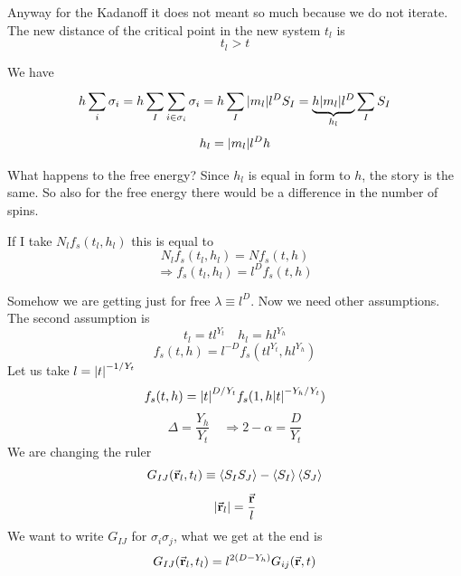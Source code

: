 \documentclass[../main/main.tex]{subfiles}
\begin{document}
Anyway for the Kadanoff it does not meant so much because we do not iterate.
The new distance of the critical point in the new system \( t_l \) is
\begin{equation}
  t_l > t
\end{equation}

We have
\begin{equation}
  h \sum_{i}^{} \sigma _i = h \sum_{I}^{} \sum_{i \in \sigma _i}^{}  \sigma _i = h \sum_{I}^{}    \abs{m_l} l^D S_I
  = \underbrace{h \abs{m_l} l^D}_{h_l} \sum_{I}^{} S_I
\end{equation}
\begin{equation}
  h_l = \abs{m_l} l^D h
\end{equation}

What happens to the free energy?
Since \( h_l \) is equal in form to \( h \), the story is the same. So also for the free energy there would be a difference in the number of spins.

If I take \(   N_l f_s (t_l,h_l) \) this is equal to
\begin{equation}
  N_l f_s (t_l,h_l) = N f_s (t,h)
\end{equation}
\begin{equation}
  \Rightarrow  f_s (t_l,h_l) = l^D f_s (t,h)
\end{equation}

Somehow we are getting just for free \( \lambda \equiv l^D \). Now we need other assumptions. The second assumption is
\begin{equation}
  t_l = t l^{Y_t} \quad h_l = h l^{Y_h}
\end{equation}
\begin{equation}
  f_s (t,h) = l^{-D} f_s (t l^{Y_t}, h l^{Y_h})
\end{equation}
Let us take \( l= \abs{t}^{-1/Y_t}  \)
\begin{equation}
  f_s (t,h) = \abs{t}^{D/Y_t} f_s (1, h \abs{t}^{-Y_h/Y_t} )
\end{equation}
\begin{equation}
  \Delta = \frac{Y_h}{Y_t} \quad \Rightarrow 2 - \alpha = \frac{D}{Y_t}
\end{equation}
We are changing the ruler
\begin{equation}
  G_{IJ} (\va{r}_l, t_l) \equiv \expval{S_I S_J} - \expval{S_I}\expval{S_J}
\end{equation}
\begin{equation}
  \abs{\va{r}_l} = \frac{\va{r}}{l}
\end{equation}
We want to write \( G_{IJ} \) for \( \sigma _i \sigma _j \), what we get at the end is
\begin{equation}
  G_{IJ} (\va{r}_l, t_l) = l^{2(D-Y_h)} G_{ij} (\va{r},t)
\end{equation}
\end{document}
